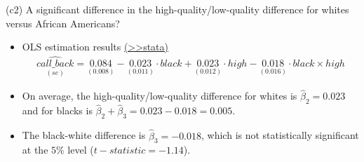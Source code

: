 \documentclass[
  10pt,
  ignorenonframetext,
]{beamer}
\providecommand{\tightlist}{%
  \setlength{\itemsep}{0pt}\setlength{\parskip}{0pt}}
\begin{document}
\begin{frame}{(c2) A significant difference in the
high-quality/low-quality difference for whites versus African
Americans?}
\protect\hypertarget{c2-a-significant-difference-in-the-high-qualitylow-quality-difference-for-whites-versus-african-americans-1}{}
\begin{itemize}
\tightlist
\item
  OLS estimation results
  \footnotesize \protect\hyperlink{res4-regHighBlack}{(\textgreater\textgreater stata)}
  \normalsize \small \[
  \begin{aligned}
  \underset{(se)}{\widehat{call\_back}} = \underset{(0.008)}{0.084} - \underset{(0.011)}{0.023}\cdot black + \underset{(0.012)}{0.023}\cdot high - \underset{(0.016)}{0.018}\cdot black \times high
  \end{aligned}
  \]
\end{itemize}

\normalsize

\begin{itemize}
\tightlist
\item
  On average, the high-quality/low-quality difference for whites is
  \(\hat{\beta}_2 = 0.023\) and for blacks is
  \(\hat{\beta}_2 + \hat{\beta}_3 = 0.023 - 0.018 = 0.005\).
\end{itemize}

\vspace{0.8mm}

\begin{itemize}
\tightlist
\item
  The black-white difference is \(\hat{\beta}_3 = -0.018\), which is not
  statistically significant at the \(5\%\) level
  (\(t-statistic = -1.14\)).
\end{itemize}
\end{frame}
\end{document}
